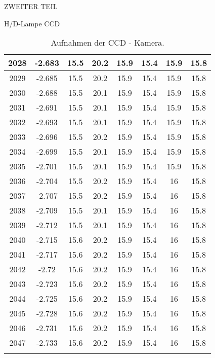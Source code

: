 \begin{appendix}
\begin{chapter}{ZWEITER TEIL}
\begin{section}{H/D-Lampe CCD}
\begin{scriptsize}
\begin{longtable}[htbp]{|c|c|c|c|c|c|c|c|}
            2028 & -2.683 & 15.5 & 20.2 & 15.9 & 15.4 & 15.9 & 15.8 \\ \hline
            2029 & -2.685 & 15.5 & 20.2 & 15.9 & 15.4 & 15.9 & 15.8 \\ \hline
            2030 & -2.688 & 15.5 & 20.1 & 15.9 & 15.4 & 15.9 & 15.8 \\ \hline
            2031 & -2.691 & 15.5 & 20.1 & 15.9 & 15.4 & 15.9 & 15.8 \\ \hline
            2032 & -2.693 & 15.5 & 20.1 & 15.9 & 15.4 & 15.9 & 15.8 \\ \hline
            2033 & -2.696 & 15.5 & 20.2 & 15.9 & 15.4 & 15.9 & 15.8 \\ \hline
            2034 & -2.699 & 15.5 & 20.1 & 15.9 & 15.4 & 15.9 & 15.8 \\ \hline
            2035 & -2.701 & 15.5 & 20.1 & 15.9 & 15.4 & 15.9 & 15.8 \\ \hline
            2036 & -2.704 & 15.5 & 20.2 & 15.9 & 15.4 & 16 & 15.8 \\ \hline
            2037 & -2.707 & 15.5 & 20.2 & 15.9 & 15.4 & 16 & 15.8 \\ \hline
            2038 & -2.709 & 15.5 & 20.1 & 15.9 & 15.4 & 16 & 15.8 \\ \hline
            2039 & -2.712 & 15.5 & 20.1 & 15.9 & 15.4 & 16 & 15.8 \\ \hline
            2040 & -2.715 & 15.6 & 20.2 & 15.9 & 15.4 & 16 & 15.8 \\ \hline
            2041 & -2.717 & 15.6 & 20.2 & 15.9 & 15.4 & 16 & 15.8 \\ \hline
            2042 & -2.72 & 15.6 & 20.2 & 15.9 & 15.4 & 16 & 15.8 \\ \hline
            2043 & -2.723 & 15.6 & 20.2 & 15.9 & 15.4 & 16 & 15.8 \\ \hline
            2044 & -2.725 & 15.6 & 20.2 & 15.9 & 15.4 & 16 & 15.8 \\ \hline
            2045 & -2.728 & 15.6 & 20.2 & 15.9 & 15.4 & 16 & 15.8 \\ \hline
            2046 & -2.731 & 15.6 & 20.2 & 15.9 & 15.4 & 16 & 15.8 \\ \hline
            2047 & -2.733 & 15.6 & 20.2 & 15.9 & 15.4 & 16 & 15.8 \\ \hline
            \caption{Aufnahmen der CCD - Kamera.}
            \label{tab:CCD}
          \end{longtable}
        \end{scriptsize}
        
      \end{section}
     
    \end{chapter}
   
  \end{appendix}
 